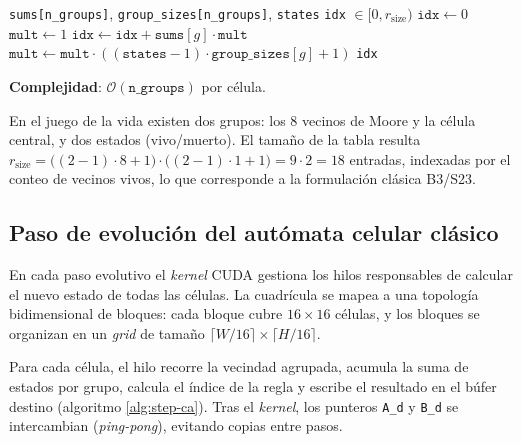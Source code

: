 \begin{breakablealgorithm}
\caption{IndiceRegla: vector de conteos $\to$ índice lineal}
\label{alg:indice}
\begin{algorithmic}[1]
\Require \texttt{sums[n\_groups]}, \texttt{group\_sizes[n\_groups]}, \texttt{states}
\Ensure \texttt{idx} $\in [0, r_{\text{size}})$
\State $\texttt{idx} \gets 0$
\State $\texttt{mult} \gets 1$
    \State $\texttt{idx} \gets \texttt{idx} + \texttt{sums}[g] \cdot \texttt{mult}$
    \State $\texttt{mult} \gets \texttt{mult} \cdot ((\texttt{states} - 1) \cdot \texttt{group\_sizes}[g] + 1)$
\EndFor
\State \Return \texttt{idx}
\end{algorithmic}
\end{breakablealgorithm}

\textbf{Complejidad}: $\mathcal{O}(\texttt{n\_groups})$ por célula. 

En el juego de la vida existen dos grupos: los 8 vecinos de Moore y la célula central, y dos estados (vivo/muerto). El tamaño de la tabla resulta $r_{\text{size}} = \bigl((2-1)\cdot 8  + 1\bigr)\cdot\bigl((2-1)\cdot 1 + 1\bigr) = 9 \cdot 2 = 18$ entradas, indexadas por el conteo de vecinos vivos, lo que corresponde a la formulación clásica B3/S23.

\subsection{Paso de evolución del autómata celular clásico}

En cada paso evolutivo el \textit{kernel} CUDA gestiona los hilos responsables de calcular el nuevo estado de todas las células. La cuadrícula se mapea a una topología bidimensional de bloques: cada bloque cubre $16 \times 16$ células, y los bloques se organizan en un \textit{grid} de tamaño $\lceil W/16 \rceil \times \lceil H/16 \rceil$.

Para cada célula, el hilo recorre la vecindad agrupada, acumula la suma de estados por grupo, calcula el índice de la regla y escribe el resultado en el búfer destino (algoritmo \ref{alg:step-ca}). Tras el \textit{kernel}, los punteros \texttt{A\_d} y \texttt{B\_d} se intercambian (\textit{ping-pong}), evitando copias entre pasos.

